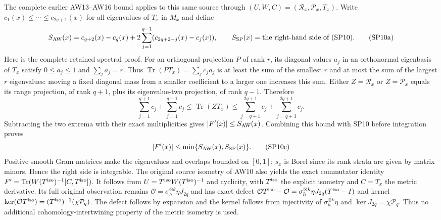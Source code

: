 The complete earlier AW13--AW16 bound applies to this same
source through $(U,W,C)=(\mathcal R_x,\mathcal P_x,T_x)$.
Write $c_1(x)\le\cdots\le c_{2q+1}(x)$ for all eigenvalues of
$T_x$ in $M_x$ and define
\[
 S_{\rm AW}(x)=c_{q+2}(x)-c_q(x)
       +2\sum_{j=1}^{q-1}(c_{2q+2-j}(x)-c_j(x)),\qquad
 S_{\rm SP}(x)=\text{the right-hand side of (SP10)}.
 \tag{SP10a}
\]
Here is the complete retained spectral proof. For an orthogonal
projection $P$ of rank $r$, its diagonal values $a_j$ in an
orthonormal eigenbasis of $T_x$ satisfy $0\le a_j\le1$ and
$\sum_j a_j=r$. Thus $\operatorname{Tr}(PT_x)=\sum_jc_ja_j$
is at least the sum of the smallest $r$ and at most the sum of
the largest $r$ eigenvalues: moving a fixed diagonal mass from
a smaller coefficient to a larger one increases this sum.
Either $Z=\mathcal R_x$ or $Z=\mathcal P_x$ equals its range
projection, of rank $q+1$, plus its eigenvalue-two projection,
of rank $q-1$. Therefore
\[
 \sum_{j=1}^{q+1}c_j+\sum_{j=1}^{q-1}c_j
 \le\operatorname{Tr}(ZT_x)\le
 \sum_{j=q+1}^{2q+1}c_j+\sum_{j=q+3}^{2q+1}c_j.
 \tag{SP10b}
\]
Subtracting the two extrema with their exact multiplicities gives
$|F'(x)|\le S_{\rm AW}(x)$. Combining this bound with SP10 before
integration proves
\[
 |F'(x)|\le\min\{S_{\rm AW}(x),S_{\rm SP}(x)\}.
 \tag{SP10c}
\]
Positive smooth Gram matrices make the eigenvalues and overlaps
bounded on $[0,1]$; $s_x$ is Borel since its rank strata are
given by matrix minors. Hence the right side is integrable.
The original source isometry of AW10 also yields the exact
commutator identity
$F'=\operatorname{Tr}(W(T^{\rm iso})^{-1}[C,T^{\rm iso}])$.
It follows from $U=T^{\rm iso}W(T^{\rm iso})^{-1}$ and cyclicity,
with $T^{\rm iso}$ the explicit isometry and $C=T_x$ the metric
derivative. Its full original observation remains
$\mathcal O=\sigma_h^{\otimes k}\eta J_{2q}$ and has exact defect
$\mathcal OT^{\rm iso}-\mathcal O
=\sigma_h^{\otimes k}\eta J_{2q}(T^{\rm iso}-I)$ and kernel
$\ker(\mathcal OT^{\rm iso})=(T^{\rm iso})^{-1}(\chi\mathcal P_q)$.
The defect follows by expansion and the kernel follows from
injectivity of $\sigma_h^{\otimes k}\eta$ and
$\ker J_{2q}=\chi\mathcal P_q$. Thus no additional
cohomology-intertwining property of the metric isometry is used.

